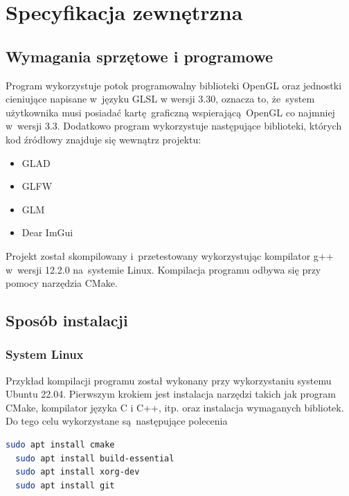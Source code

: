 \chapter{Specyfikacja zewnętrzna}
\label{ch:04}

\section{Wymagania sprzętowe i programowe}

Program wykorzystuje potok programowalny biblioteki OpenGL oraz jednostki cieniujące napisane w~języku GLSL w wersji 3.30, oznacza to, że~system użytkownika musi posiadać kartę graficzną wspierającą OpenGL co najmniej w~wersji 3.3.
Dodatkowo program wykorzystuje następujące biblioteki, których kod źródłowy znajduje się wewnątrz projektu:
\begin{itemize}
\item GLAD
\item GLFW
\item GLM
\item Dear ImGui
\end{itemize}

Projekt został skompilowany i~przetestowany wykorzystując kompilator g++
w~wersji 12.2.0 na~systemie Linux. Kompilacja programu odbywa się przy pomocy narzędzia CMake.

\section{Sposób instalacji}
\subsection{System Linux}
Przykład kompilacji programu został wykonany przy wykorzystaniu systemu Ubuntu 22.04. Pierwszym krokiem jest instalacja narzędzi takich jak program CMake, kompilator języka C i C++, itp. oraz instalacja wymaganych bibliotek.
Do tego celu wykorzystane są następujące polecenia
\lstset{basicstyle=\ttfamily, language=bash}
\begin{lstlisting}[language=bash]
  sudo apt install cmake
  sudo apt install build-essential
  sudo apt install xorg-dev
  sudo apt install git
\end{lstlisting}

